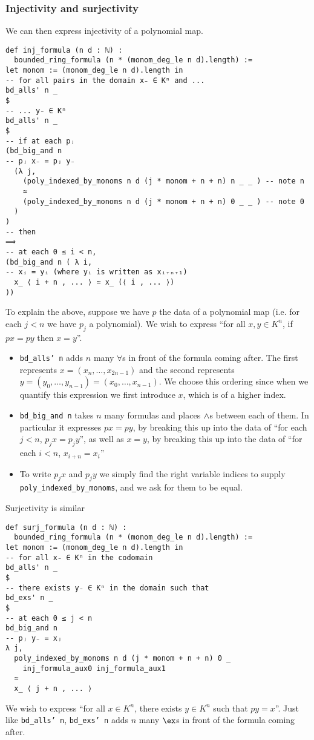 \subsubsection*{Injectivity and surjectivity}

We can then express injectivity of a polynomial map.

\begin{lstlisting}
def inj_formula (n d : ℕ) :
  bounded_ring_formula (n * (monom_deg_le n d).length) :=
let monom := (monom_deg_le n d).length in
-- for all pairs in the domain x₋ ∈ Kⁿ and ...
bd_alls' n _
$
-- ... y₋ ∈ Kⁿ
bd_alls' n _
$
-- if at each pⱼ
(bd_big_and n
-- pⱼ x₋ = pⱼ y₋
  (λ j,
    (poly_indexed_by_monoms n d (j * monom + n + n) n _ _ ) -- note n
    ≃
    (poly_indexed_by_monoms n d (j * monom + n + n) 0 _ _ ) -- note 0
  )
)
-- then
⟹
-- at each 0 ≤ i < n,
(bd_big_and n ( λ i,
-- xᵢ = yᵢ (where yᵢ is written as xᵢ₊ₙ₊₁)
  x_ ⟨ i + n , ... ⟩ ≃ x_ (⟨ i , ... ⟩)
))
\end{lstlisting}

To explain the above, suppose we have $p$ the data of a polynomial map
(i.e. for each $j < n$ we have $p_j$ a polynomial).
We wish to express ``for all $x,y \in K^{n}$,
if $p x = p y$ then $x = y$''.
\begin{itemize}
  \item \texttt{bd\_alls' n} adds $n$ many $\forall$s in front of the
        formula coming after.
        The first represents $x = (x_{n},\dots,x_{2n-1})$ and the second represents
        $y = (y_{0},\dots,y_{n-1}) = (x_{0},\dots,x_{n-1})$.
        We choose this ordering since when we quantify this expression
        we first introduce $x$, which is of a higher index.
  \item \texttt{bd\_big\_and n} takes $n$ many formulas and places $\land$s between
        each of them. In particular it expresses $p x = p y$, by breaking this up
        into the data of ``for each $j < n$, $p_{j} x = p_{j} y$'',
        as well as $x = y$, by breaking this up into the data of ``for each $i < n$,
        $x_{i+n} = x_{i}$''
  \item To write $p_{j} x$ and $p_{j} y$ we simply find the right variable indices
        to supply \texttt{poly\_indexed\_by\_monoms},
        and we ask for them to be equal.
\end{itemize}

Surjectivity is similar

\begin{lstlisting}
def surj_formula (n d : ℕ) :
  bounded_ring_formula (n * (monom_deg_le n d).length) :=
let monom := (monom_deg_le n d).length in
-- for all x₋ ∈ Kⁿ in the codomain
bd_alls' n _
$
-- there exists y₋ ∈ Kⁿ in the domain such that
bd_exs' n _
$
-- at each 0 ≤ j < n
bd_big_and n
-- pⱼ y₋ = xⱼ
λ j,
  poly_indexed_by_monoms n d (j * monom + n + n) 0 _
    inj_formula_aux0 inj_formula_aux1
  ≃
  x_ ⟨ j + n , ... ⟩ \end{lstlisting}

We wish to express ``for all $x \in K^{n}$, there exists $y \in K^{n}$ such that $p y = x$''.
Just like \texttt{bd\_alls' n}, \texttt{bd\_exs' n} adds $n$ many $\ex$s in front of the
formula coming after.

